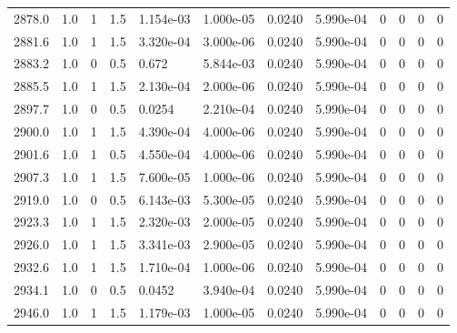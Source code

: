 \documentclass[preview]{standalone}
\begin{document}
{{{{{{{{{{{{\begin{tabular}{L{1.2cm}C{1.2cm} C{0.3cm}C{0.5cm} C{1.4cm}C{1.4cm} C{1.4cm}C{1.4cm} C{1.6cm}C{1.6cm} C{1.6cm}C{1.6cm}}
  2878.0  &   1.0  & 1     & 1.5 &  1.154e-03  & 1.000e-05  &  0.0240&   5.990e-04& 0 & 0   &  0 & 0  \\ 
  2881.6  &   1.0  & 1     & 1.5 &  3.320e-04  & 3.000e-06  &  0.0240&   5.990e-04& 0 & 0   &  0 & 0  \\ 
  2883.2  &   1.0  & 0     & 0.5 &  0.672  & 5.844e-03  &  0.0240&   5.990e-04& 0 & 0   &  0 & 0  \\ 
  2885.5  &   1.0  & 1     & 1.5 &  2.130e-04  & 2.000e-06  &  0.0240&   5.990e-04& 0 & 0   &  0 & 0  \\ 
  2897.7  &   1.0  & 0     & 0.5 &  0.0254  & 2.210e-04  &  0.0240&   5.990e-04& 0 & 0   &  0 & 0  \\ 
  2900.0  &   1.0  & 1     & 1.5 &  4.390e-04  & 4.000e-06  &  0.0240&   5.990e-04& 0 & 0   &  0 & 0  \\ 
  2901.6  &   1.0  & 1     & 0.5 &  4.550e-04  & 4.000e-06  &  0.0240&   5.990e-04& 0 & 0   &  0 & 0  \\ 
  2907.3  &   1.0  & 1     & 1.5 &  7.600e-05  & 1.000e-06  &  0.0240&   5.990e-04& 0 & 0   &  0 & 0  \\ 
  2919.0  &   1.0  & 0     & 0.5 &  6.143e-03  & 5.300e-05  &  0.0240&   5.990e-04& 0 & 0   &  0 & 0  \\ 
  2923.3  &   1.0  & 1     & 1.5 &  2.320e-03  & 2.000e-05  &  0.0240&   5.990e-04& 0 & 0   &  0 & 0  \\ 
  2926.0  &   1.0  & 1     & 1.5 &  3.341e-03  & 2.900e-05  &  0.0240&   5.990e-04& 0 & 0   &  0 & 0  \\ 
  2932.6  &   1.0  & 1     & 1.5 &  1.710e-04  & 1.000e-06  &  0.0240&   5.990e-04& 0 & 0   &  0 & 0  \\ 
  2934.1  &   1.0  & 0     & 0.5 &  0.0452  & 3.940e-04  &  0.0240&   5.990e-04& 0 & 0   &  0 & 0  \\ 
  2946.0  &   1.0  & 1     & 1.5 &  1.179e-03  & 1.000e-05  &  0.0240&   5.990e-04& 0 & 0   &  0 & 0  \\ 
\hline 
\end{tabular} 

}}}}}}}}}}}}
\end{document}
